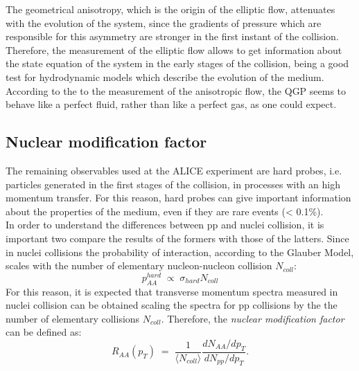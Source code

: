 The geometrical anisotropy, which is the origin of the elliptic flow, attenuates with the evolution of the system, since the gradients of pressure which are responsible for this asymmetry are stronger in the first instant of the collision. Therefore, the measurement of the elliptic flow allows to get information about the state equation of the system in the early stages of the collision, being a good test for hydrodynamic models which describe the evolution of the medium. According to the to the measurement of the anisotropic flow, the QGP seems to behave like a perfect fluid, rather than like a perfect gas, as one could expect.\\
\subsection{Nuclear modification factor}
The remaining observables used at the ALICE experiment are hard probes, i.e. particles generated in the first stages of the collision, in processes with an high momentum transfer. For this reason, hard probes can give important information about the properties of the medium, even if they are rare events (< 0.1\%).\\
In order to understand the differences between pp and nuclei collision, it is important two compare the results of the formers with those of the latters.
Since in nuclei collisions the probability of interaction, according to the Glauber Model, scales with the number of elementary nucleon-nucleon collision $N_{coll}$:
\begin{equation}
 p_{AA}^{hard}\;\propto\;\sigma_{hard}N_{coll}
\end{equation}
For this reason, it is expected that transverse momentum spectra measured in nuclei collision can be obtained scaling the spectra for pp collisions by the the number of elementary collisions $N_{coll}$.
Therefore, the \textit{nuclear modification factor}  can be defined as:
\begin{equation}
 R_{AA}(p_{T})\;=\;\frac{1}{\langle N_{coll}\rangle}\frac{dN_{AA}/dp_{T}}{dN_{pp}/dp_{T}}.
\end{equation}

